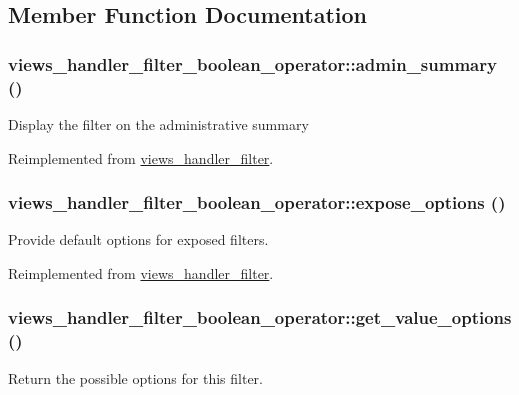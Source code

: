 \subsection{Member Function Documentation}
\hypertarget{classviews__handler__filter__boolean__operator_a7b58a9b58ae9778383b6a215834d7cdb}{
\subsubsection[{admin\_\-summary}]{\setlength{\rightskip}{0pt plus 5cm}views\_\-handler\_\-filter\_\-boolean\_\-operator::admin\_\-summary ()}}
\label{classviews__handler__filter__boolean__operator_a7b58a9b58ae9778383b6a215834d7cdb}
Display the filter on the administrative summary 

Reimplemented from \hyperlink{classviews__handler__filter_a655263cd0b73188eec064b9a9743fe4c}{views\_\-handler\_\-filter}.\hypertarget{classviews__handler__filter__boolean__operator_a24ff1f565f02838bc2a63939ab510d89}{
\subsubsection[{expose\_\-options}]{\setlength{\rightskip}{0pt plus 5cm}views\_\-handler\_\-filter\_\-boolean\_\-operator::expose\_\-options ()}}
\label{classviews__handler__filter__boolean__operator_a24ff1f565f02838bc2a63939ab510d89}
Provide default options for exposed filters. 

Reimplemented from \hyperlink{classviews__handler__filter_a07ab6afc47bf892fb5fd5934c3f1d64c}{views\_\-handler\_\-filter}.\hypertarget{classviews__handler__filter__boolean__operator_ad2c5508cee59025448c3c18a862976d8}{
\subsubsection[{get\_\-value\_\-options}]{\setlength{\rightskip}{0pt plus 5cm}views\_\-handler\_\-filter\_\-boolean\_\-operator::get\_\-value\_\-options ()}}
\label{classviews__handler__filter__boolean__operator_ad2c5508cee59025448c3c18a862976d8}
Return the possible options for this filter.

